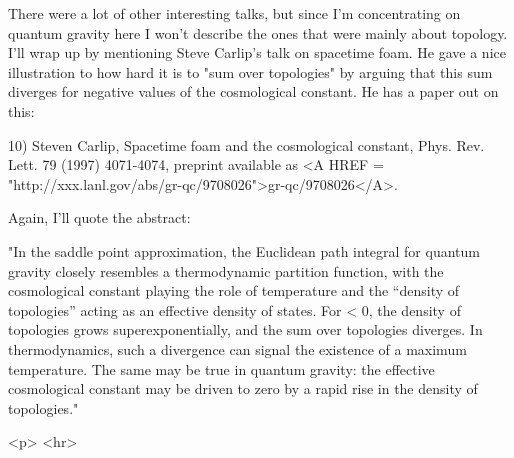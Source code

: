 There were a lot of other interesting talks, but since I'm concentrating
on quantum gravity here I won't describe the ones that were mainly about
topology.  I'll wrap up by mentioning Steve Carlip's talk on spacetime
foam.  He gave a nice illustration to how hard it is to "sum over
topologies" by arguing that this sum diverges for negative values of the
cosmological constant.  He has a paper out on this:

10) Steven Carlip, Spacetime foam and the cosmological constant,
Phys. Rev. Lett. 79 (1997) 4071-4074, preprint available as 
<A HREF = "http://xxx.lanl.gov/abs/gr-qc/9708026">gr-qc/9708026</A>.

Again, I'll quote the abstract:

"In the saddle point approximation, the Euclidean path integral for
quantum gravity closely resembles a thermodynamic partition function,
with the cosmological constant \Lambda  playing the role of temperature
and the ``density of topologies'' acting as an effective density of
states. For \Lambda  < 0, the density of topologies grows
superexponentially, and the sum over topologies diverges. In
thermodynamics, such a divergence can signal the existence of a maximum
temperature. The same may be true in quantum gravity: the effective
cosmological constant may be driven to zero by a rapid rise in the
density of topologies."







<p> <hr>



